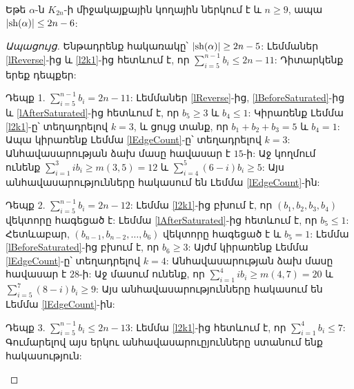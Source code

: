 \begin{lemma}
\label{l2n6}
Եթե $\alpha$-ն $K_{2n}$-ի միջակայքային կողային ներկում է և $n\geq 9$, ապա  
$|{\rm sh}(\alpha)| \leq 2n-6$:
\end{lemma}
\begin{proof}[Ապացույց]
Ենթադրենք հակառակը՝ $|{\rm sh}(\alpha)| \geq 2n-5$: Լեմմաներ \ref{lReverse}-ից և \ref{l2k1}-ից հետևում է, որ $\sum\limits_{i=5}^{n-1}{b_i} \leq 2n-11$: Դիտարկենք երեք դեպքեր:
\begin{description}
\item{Դեպք 1.} $\sum\limits_{i=5}^{n-1}{b_i} = 2n-11$: Լեմմաներ \ref{lReverse}-ից, \ref{lBeforeSaturated}-ից և \ref{lAfterSaturated}-ից հետևում է, որ $b_{5} \geq 3$ և $b_{4} \leq 1$: Կիրառենք Լեմմա \ref{l2k1}-ը՝ տեղադրելով $k=3$, և ցույց տանք, որ $b_{1} + b_{2} + b_{3} = 5$ և $b_{4}=1$: Ապա կիրառենք Լեմմա \ref{lEdgeCount}-ը՝ տեղադրելով $k=3$: Անհավասարության ձախ մասը հավասար է $15$-ի: Աջ կողմում ունենք $\sum\limits_{i=1}^{3}{ib_i} \geq m(3,5)=12$ և $\sum\limits_{i=4}^{5}{(6-i)b_i} \geq 5$: Այս անհավասարությունները հակասում են Լեմմա \ref{lEdgeCount}-ին:

\item{Դեպք 2.} $\sum\limits_{i=5}^{n-1}{b_i} = 2n-12$: Լեմմա \ref{l2k1}-ից բխում է, որ $(b_1,b_2,b_3,b_4)$ վեկտորը հագեցած է: Լեմմա \ref{lAfterSaturated}-ից հետևում է, որ $b_5 \leq 1$: Հետևաբար, $(b_{n-1},b_{n-2},\ldots,b_6)$ վեկտորը հագեցած է և $b_5=1$: Լեմմա \ref{lBeforeSaturated}-ից բխում է, որ $b_6 \geq 3$: Այժմ կիրառենք Լեմմա \ref{lEdgeCount}-ը՝ տեղադրելով $k=4$: Անհավասարության ձախ մասը հավասար է $28$-ի: Աջ մասում ունենք, որ $\sum\limits_{i=1}^{4}{ib_i} \geq m(4,7)=20$ և $\sum\limits_{i=5}^{7}{(8-i)b_i} \geq 9$: Այս անհավասարությունները հակասում են Լեմմա \ref{lEdgeCount}-ին:

\item{Դեպք 3.} $\sum\limits_{i=5}^{n-1}{b_i} \leq 2n-13$: Լեմմա \ref{l2k1}-ից հետևում է, որ $\sum\limits_{i=1}^{4}{b_i} \leq 7$: Գումարելով այս երկու անհավասարուըյունները ստանում ենք հակասություն:
\end{description}
\end{proof}

